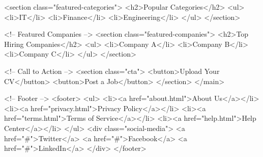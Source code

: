 <section class="featured-categories">
<h2>Popular Categories</h2>
<ul>
  <li>IT</li>
  <li>Finance</li>
  <li>Engineering</li>
</ul>
</section>

<!-- Featured Companies -->
<section class="featured-companies">
<h2>Top Hiring Companies</h2>
<ul>
  <li>Company A</li>
  <li>Company B</li>
  <li>Company C</li>
</ul>
</section>

<!-- Call to Action -->
<section class="cta">
<button>Upload Your CV</button>
<button>Post a Job</button>
</section>
</main>

<!-- Footer -->
<footer>
<ul>
<li><a href="about.html">About Us</a></li>
<li><a href="privacy.html">Privacy Policy</a></li>
<li><a href="terms.html">Terms of Service</a></li>
<li><a href="help.html">Help Center</a></li>
</ul>
<div class="social-media">
<a href="#">Twitter</a>
<a href="#">Facebook</a>
<a href="#">LinkedIn</a>
</div>
</footer>